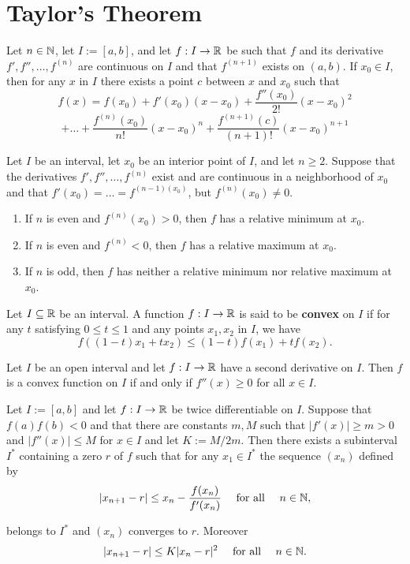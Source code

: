 \section{Taylor's Theorem}

\begin{theorem}
	Let $n \in \mathbb{N}$, let $I:=[a,b]$, and let $f:I \rightarrow \mathbb{R}$ be such that $f$ and its derivative $f', f'', \dots, f^{(n)}$ are continuous on $I$ and that $f^{(n+1)}$ exists on $(a,b)$. If $x_0\in I$, then for any $x$ in $I$ there exists a point $c$ between $x$ and $x_0$ such that
	\[f(x) = f(x_0) + f'(x_0)(x-x_0) + \frac{f''(x_0)}{2!}(x-x_0)^2\]
	\[+ \dots + \frac{f^{(n)}(x_0)}{n!}(x-x_0)^n + \frac{f^{(n+1)}(c)}{(n+1)!}(x-x_0)^{n+1}\]
\end{theorem}

\begin{theorem}
	Let $I$ be an interval, let $x_0$ be an interior point of $I$, and let $n \geq 2$. Suppose that the derivatives $f', f'', \dots, f^{(n)}$ exist and are continuous in a neighborhood of $x_0$ and that $f'(x_0) = \dots = f^{(n-1)(x_0)}$, but $f^{(n)}(x_0) \neq 0$.
	\begin{enumerate}
		\item If $n$ is even and $f^{(n)}(x_0) >0$, then $f$ has a relative minimum at $x_0$.

		\item If $n$ is even and $f^{(n)}<0$, then $f$ has a relative maximum at $x_0$.

		\item If $n$ is odd, then $f$ has neither a relative minimum nor relative maximum at $x_0$.
	\end{enumerate}
\end{theorem}

\begin{definition}
	Let $I \subseteq \mathbb{R}$ be an interval. A function $f:I \rightarrow \mathbb{R}$ is said to be \textbf{convex} on $I$ if for any $t$ satisfying $0 \leq t \leq 1$ and any points $x_1, x_2$ in $I$, we have
	\[f((1-t)x_1+tx_2) \leq (1-t)f(x_1)+tf(x_2).\]
\end{definition}

\begin{theorem}
	Let $I$ be an open interval and let $f: I \rightarrow \mathbb{R}$ have a second derivative on $I$. Then $f$ is a convex function on $I$ if and only if $f''(x) \geq 0$ for all $x \in I$.
\end{theorem}

\begin{theorem}
	Let $I:=[a,b]$ and let $f:I \rightarrow \mathbb{R}$ be twice differentiable on $I$. Suppose that $f(a)f(b) < 0$ and that there are constants $m,M$ such that $|f'(x)| \geq m > 0$ and $|f''(x)| \leq M$ for $x \in I$ and let $K:=M/2m$. Then there exists a subinterval $I^*$ containing a zero $r$ of $f$ such that for any $x_1 \in I^*$ the sequence $(x_n)$ defined by
	\[|x_{n+1}-r|\leq x_n - \frac{f(x_n)}{f'(x_n)}\ \ \ \ \text{for all}\ \ \ \ n \in \mathbb{N},\]

	belongs to $I^*$ and $(x_n)$ converges to $r$. Moreover
	\[|x_{n+1}-r| \leq K|x_n-r|^2\ \ \ \ \text{for all}\ \ \ \ n \in \N.\]
\end{theorem}
